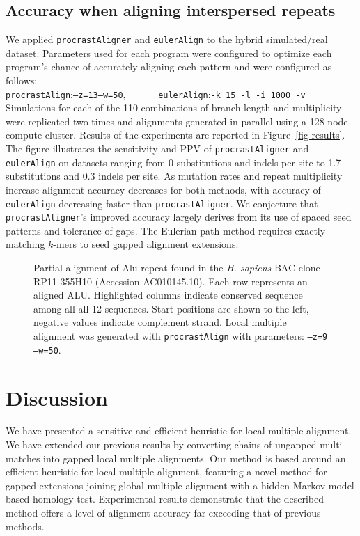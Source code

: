 \documentclass{ws-procs975x65}
\begin{document}
\subsection{Accuracy when aligning interspersed repeats}
We applied \texttt{procrastAligner} and \texttt{eulerAlign} to the hybrid simulated/real dataset.  Parameters used for each program were configured to optimize each program's chance of accurately aligning each pattern and were configured as follows:\\\texttt{procrastAlign}:\texttt{--z=13--w=50},
\ \ \ \ \ \ \texttt{eulerAlign}:\texttt{-k 15 -l -i 1000 -v} \\
Simulations for each of the 110 combinations of branch length and multiplicity were replicated two times and alignments generated in parallel using a 128 node compute cluster.  Results of the experiments are reported in Figure~\ref{fig-results}. The figure illustrates the sensitivity and PPV of \texttt{procrastAligner} and \texttt{eulerAlign} on datasets ranging from 0 substitutions and indels per site to 1.7 substitutions and 0.3 indels per site.  As mutation rates and repeat multiplicity increase alignment accuracy decreases for both methods, with accuracy of \texttt{eulerAlign} decreasing faster than \texttt{procrastAligner}.  We conjecture that \texttt{procrastAligner}'s improved accuracy largely derives from its use of spaced seed patterns\cite{ref-procrast} and tolerance of gaps.  The Eulerian path method requires exactly matching $k$-mers to seed gapped alignment extensions.


\begin{figure}[t]
\centering {}
\caption{Partial alignment of Alu repeat found in the \emph{H. sapiens} BAC clone RP11-355H10 (Accession AC010145.10). Each row represents an aligned ALU. Highlighted columns indicate conserved sequence among all all 12 sequences. Start positions are shown to the left, negative values indicate complement strand.  Local multiple alignment was generated with \texttt{procrastAlign} with parameters: \texttt{--z=9 --w=50}.  }
\label{fig-align}
\end{figure}

\section{Discussion}
We have presented a sensitive and efficient heuristic for local multiple alignment. We have extended our previous results by converting chains of ungapped multi-matches into gapped local multiple alignments. Our method is based around an efficient heuristic for local multiple alignment, featuring a novel method for gapped extensions joining global multiple alignment with a hidden Markov model based homology test.  Experimental results demonstrate that the described method offers a level of alignment accuracy far exceeding that of previous methods.
\end{document}
